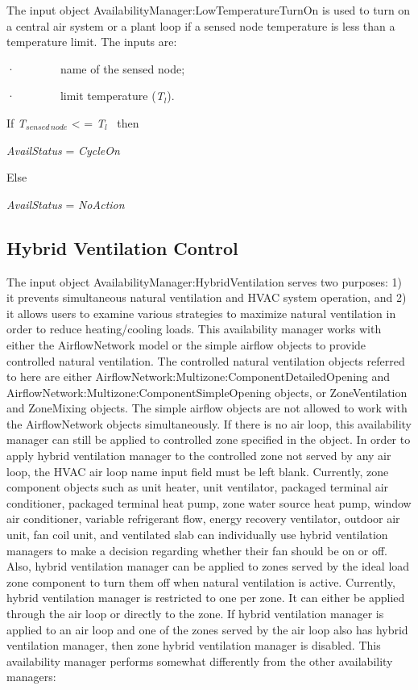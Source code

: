 The input object AvailabilityManager:LowTemperatureTurnOn is used to turn on a central air system or a plant loop if a sensed node temperature is less than a temperature limit. The inputs are:

·~~~~~~~~name of the sensed node;

·~~~~~~~~limit temperature (\emph{T\(_{l}\)}).

If \emph{T\(_{sensed\, node}\)} \textless{} = \emph{T\(_{l}\)}~ then

\emph{AvailStatus} = \emph{CycleOn}

Else

\emph{AvailStatus} = \emph{NoAction}

\subsection{Hybrid Ventilation Control}\label{hybrid-ventilation-control}

The input object AvailabilityManager:HybridVentilation serves two purposes: 1) it prevents simultaneous natural ventilation and HVAC system operation, and 2) it allows users to examine various strategies to maximize natural ventilation in order to reduce heating/cooling loads. This availability manager works with either the AirflowNetwork model or the simple airflow objects to provide controlled natural ventilation. The controlled natural ventilation objects referred to here are either AirflowNetwork:Multizone:ComponentDetailedOpening and AirflowNetwork:Multizone:ComponentSimpleOpening objects, or ZoneVentilation and ZoneMixing objects. The simple airflow objects are not allowed to work with the AirflowNetwork objects simultaneously. If there is no air loop, this availability manager can still be applied to controlled zone specified in the object. In order to apply hybrid ventilation manager to the controlled zone not served by any air loop, the HVAC air loop name input field must be left blank. Currently, zone component objects such as unit heater, unit ventilator, packaged terminal air conditioner, packaged terminal heat pump, zone water source heat pump, window air conditioner, variable refrigerant flow, energy recovery ventilator, outdoor air unit, fan coil unit, and ventilated slab can individually use hybrid ventilation managers to make a decision regarding whether their fan should be on or off. Also, hybrid ventilation manager can be applied to zones served by the ideal load zone component to turn them off when natural ventilation is active. Currently, hybrid ventilation manager is restricted to one per zone. It can either be applied through the air loop or directly to the zone. If hybrid ventilation manager is applied to an air loop and one of the zones served by the air loop also has hybrid ventilation manager, then zone hybrid ventilation manager is disabled. This availability manager performs somewhat differently from the other availability managers:

